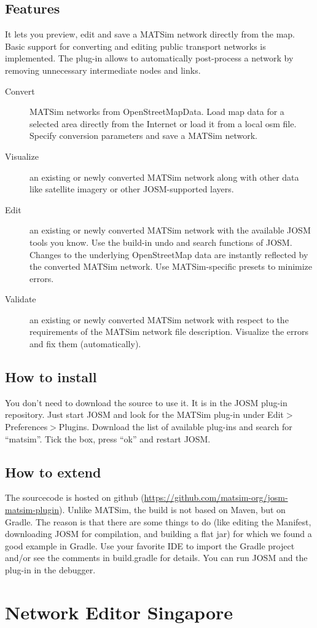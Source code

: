 \subsection{Features}
It lets you preview, edit and save a MATSim network directly from the map. Basic support for converting and editing public transport networks is implemented. The plug-in allows to automatically post-process a network by removing unnecessary intermediate nodes and links.
\begin{description}
\item[Convert] MATSim networks from OpenStreetMapData. Load map data for a selected area directly from the Internet or load it from a local osm file. Specify conversion parameters and save a MATSim network.
\item[Visualize] an existing or newly converted MATSim network along with other data like satellite imagery or other JOSM-supported layers.
\item[Edit] an existing or newly converted MATSim network with the available JOSM tools you know. Use the build-in undo and search functions of JOSM. Changes to the underlying OpenStreetMap data are instantly reflected by the converted MATSim network. Use MATSim-specific presets to minimize errors.
\item[Validate] an existing or newly converted MATSim network with respect to the requirements of the MATSim network file description. Visualize the errors and fix them (automatically). 
\end{description}

\subsection{How to install}
You don't need to download the source to use it. It is in the JOSM plug-in repository. Just start JOSM and look for the MATSim plug-in under Edit$>$Preferences$>$Plugins. Download the list of available plug-ins and search for ``matsim''. Tick the box, press ``ok'' and restart JOSM.

\subsection{How to extend}
The sourcecode is hosted on github (\url{https://github.com/matsim-org/josm-matsim-plugin}). Unlike MATSim, the build is not based on Maven, but on Gradle. The reason is that there are some things to do (like editing the Manifest, downloading JOSM for compilation, and building a flat jar) for which we found a good example in Gradle. Use your favorite IDE to import the Gradle project and/or see the comments in build.gradle for details. You can run JOSM and the plug-in in the debugger.
 
\section{Network Editor Singapore}
\citet[][]{Ordonez_Webpage_2011_3}

